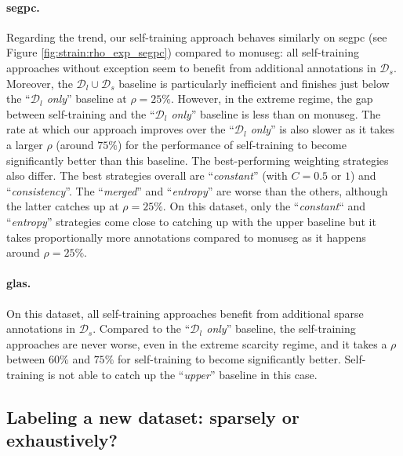 \paragraph{\acrshort{segpc}.} Regarding the trend, our self-training approach behaves similarly on \acrshort{segpc} (see Figure \ref{fig:strain:rho_exp_segpc}) compared to \acrshort{monuseg}: all self-training approaches without exception seem to benefit from additional annotations in $\mathcal{D}_s$. Moreover, the $\mathcal{D}_l \cup \mathcal{D}_s$ baseline is particularly inefficient and finishes just below the ``\textit{$\mathcal{D}_l$ only}'' baseline at $\rho = 25\%$. However, in the extreme regime, the gap between self-training and the ``\textit{$\mathcal{D}_l$ only}'' baseline is less than on \acrshort{monuseg}. The rate at which our approach improves over the ``\textit{$\mathcal{D}_l$ only}'' is also slower as it takes a larger $\rho$ (around $75\%$) for the performance of self-training to become significantly better than this baseline. The best-performing weighting strategies also differ. The best strategies overall are ``\textit{constant}'' (with $C = 0.5$ or $1$) and ``\textit{consistency}''. The ``\textit{merged}'' and ``\textit{entropy}'' are worse than the others, although the latter catches up at $\rho = 25\%$. On this dataset, only the ``\textit{constant}`` and ``\textit{entropy}'' strategies come close to catching up with the upper baseline but it takes proportionally more annotations compared to \acrshort{monuseg} as it happens around $\rho = 25\%$.

\paragraph{\acrshort{glas}.} On this dataset, all self-training approaches benefit from additional sparse annotations in $\mathcal{D}_s$. Compared to the ``\textit{$\mathcal{D}_l$ only}'' baseline, the self-training approaches are never worse, even in the extreme scarcity regime, and it takes a $\rho$ between $60\%$ and $75\%$ for self-training to become significantly better. Self-training is not able to catch up the ``\textit{upper}'' baseline in this case. 

\subsection{Labeling a new dataset: sparsely or exhaustively?}
\label{ssec:strain:sparsevsexhaustive}

